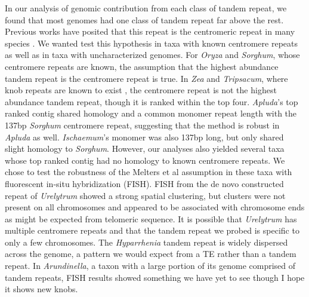 \documentclass[10pt,letterpaper]{article}
\newcommand{\jri}[1]{\todo[size=\scriptsize, color=SkyBlue]{#1}}
\newcommand{\pb}[1]{\todo[size=\scriptsize, color=Bittersweet]{#1}} %
\begin{document}
In our analysis of genomic contribution from each class of tandem repeat, we found that most genomes had one class of tandem repeat far above the rest.
Previous works have posited that this repeat is the centromeric repeat in many species \cite{melters2013comparative}.
We wanted test this hypothesis in taxa with known centromere repeats as well as in taxa with uncharacterized genomes.
For \emph{Oryza} and \emph{Sorghum}, whose centromere repeats are known, the assumption that the highest abundance tandem repeat is the centromere repeat is true.
In \emph{Zea} and \emph{Tripsacum}, where knob repeats are known to exist \cite{dennis1984knob}, the centromere repeat is not the highest abundance tandem repeat, though it is ranked within the top four.
\emph{Apluda}'s top ranked contig shared homology and a common monomer repeat length with the 137bp \emph{Sorghum} centromere repeat, suggesting that the method is robust in \emph{Apluda} as well.
\emph{Ischaemum}'s monomer was also 137bp long, but only shared slight homology to \emph{Sorghum}.
However, our analyses also yielded several taxa whose top ranked contig had no homology to known centromere repeats.
We chose to test the robustness of the Melters et al \cite{melters2013comparative} assumption in these taxa with fluorescent in-situ hybridization (FISH).
FISH from the de novo constructed repeat of \emph{Urelytrum} showed a strong spatial clustering, but clusters were not present on all chromosomes and appeared to be associated with chromosome ends as might be expected from telomeric sequence.%
It is possible that \emph{Urelytrum} has multiple centromere repeats and that the tandem repeat we probed is specific to only a few chromosomes.
The \emph{Hyparrhenia} tandem repeat is widely dispersed across the genome, a pattern we would expect from a TE rather than a tandem repeat.
In \emph{Arundinella}, a taxon with a large portion of its genome comprised of tandem repeats, FISH results showed something we have yet to see though I hope it shows new knobs.
\\
\end{document}
